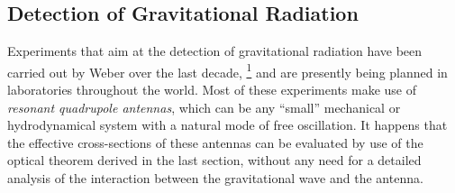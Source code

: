 
\subsection{Detection of Gravitational Radiation}\label{sec:10.7}

Experiments that aim at the detection of gravitational radiation have been
carried out by Weber over the last decade,%
\hyperref[ch10-ref-1]{\textsuperscript{1}}
and are presently being planned in laboratories throughout the world. Most of
these experiments make use of \emph{resonant quadrupole antennas}, which can be
any ``small'' mechanical or hydrodynamical system with a natural mode of free
oscillation. It happens that the effective cross-sections of these antennas can
be evaluated by use of the optical theorem derived in the last section, without
any need for a detailed analysis of the interaction between the gravitational
wave and the antenna.

